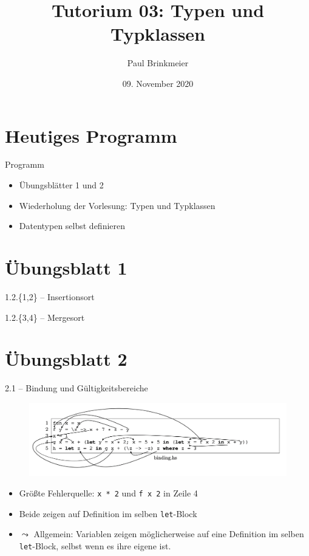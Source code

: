 \documentclass{beamer}
\title{Tutorium 03: Typen und Typklassen}
\author{Paul Brinkmeier}
\institute{Tutorium Programmierparadigmen am KIT}
\date{09. November 2020}
\begin{document}
\begin{frame}
	\titlepage
\end{frame}

\section{Heutiges Programm}
\begin{frame}{Programm}
	\begin{itemize}
        \item Übungsblätter 1 und 2
		\item Wiederholung der Vorlesung: Typen und Typklassen
		\item Datentypen selbst definieren
	\end{itemize}
\end{frame}

\section{Übungsblatt 1}

\begin{frame}{1.2.\{1,2\} -- Insertionsort}
\end{frame}

\begin{frame}{1.2.\{3,4\} -- Mergesort}
\end{frame}

\section{Übungsblatt 2}

\begin{frame}{2.1 -- Bindung und Gültigkeitsbereiche}
    \begin{figure}
        \includegraphics[width=\textwidth]{images/binding.png}
    \end{figure}

    \begin{itemize}
        \item Größte Fehlerquelle: \texttt{x * 2} und \texttt{f x 2} in Zeile 4
        \item Beide zeigen auf Definition im selben \texttt{let}-Block
        \item $\leadsto$ Allgemein: Variablen zeigen möglicherweise auf eine Definition im selben \texttt{let}-Block, selbst wenn es ihre eigene ist.
    \end{itemize}
\end{frame}
\end{document}
